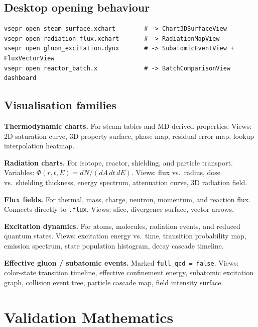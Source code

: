 \documentclass[11pt, a4paper, oneside]{article}
\begin{document}
\subsection{Desktop opening behaviour}

\begin{lstlisting}[caption={Qt desktop launch examples.}]
vsepr open steam_surface.xchart        # -> Chart3DSurfaceView
vsepr open radiation_flux.xchart       # -> RadiationMapView
vsepr open gluon_excitation.dynx       # -> SubatomicEventView + FluxVectorView
vsepr open reactor_batch.x             # -> BatchComparisonView dashboard
\end{lstlisting}

\subsection{Visualisation families}

\textbf{Thermodynamic charts.} For steam tables and MD-derived properties.
Views: 2D saturation curve, 3D property surface, phase map, residual error
map, lookup interpolation heatmap.

\textbf{Radiation charts.} For isotope, reactor, shielding, and particle
transport. Variables: $\Phi(r,t,E) = dN/(dA\,dt\,dE)$. Views: flux vs.\
radius, dose vs.\ shielding thickness, energy spectrum, attenuation curve,
3D radiation field.

\textbf{Flux fields.} For thermal, mass, charge, neutron, momentum, and
reaction flux. Connects directly to \texttt{.flux}. Views: slice, divergence
surface, vector arrows.

\textbf{Excitation dynamics.} For atoms, molecules, radiation events, and
reduced quantum states. Views: excitation energy vs.\ time, transition
probability map, emission spectrum, state population histogram, decay cascade
timeline.

\textbf{Effective gluon / subatomic events.} Marked \texttt{full\_qcd =
false}. Views: color-state transition timeline, effective confinement energy,
subatomic excitation graph, collision event tree, particle cascade map, field
intensity surface.

\section{Validation Mathematics}
\label{sec:validation}
\end{document}

